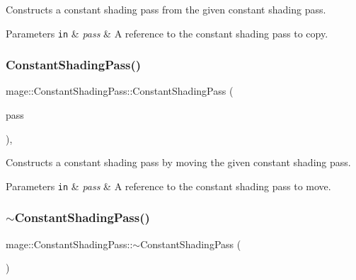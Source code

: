 Constructs a constant shading pass from the given constant shading pass.


\begin{DoxyParams}[1]{Parameters}
\mbox{\tt in}  & {\em pass} & A reference to the constant shading pass to copy. \\
\hline
\end{DoxyParams}
\hypertarget{classmage_1_1_constant_shading_pass_ac613e44e8f19485a0ee0b71b4f30be91}{}\label{classmage_1_1_constant_shading_pass_ac613e44e8f19485a0ee0b71b4f30be91} 
\subsubsection{\texorpdfstring{Constant\+Shading\+Pass()}{ConstantShadingPass()}\hspace{0.1cm}{\footnotesize\ttfamily [3/3]}}
{\footnotesize\ttfamily mage\+::\+Constant\+Shading\+Pass\+::\+Constant\+Shading\+Pass (\begin{DoxyParamCaption}\item[{\hyperlink{classmage_1_1_constant_shading_pass}{Constant\+Shading\+Pass} \&\&}]{pass }\end{DoxyParamCaption})\hspace{0.3cm}{\ttfamily [default]}, {\ttfamily [noexcept]}}

Constructs a constant shading pass by moving the given constant shading pass.


\begin{DoxyParams}[1]{Parameters}
\mbox{\tt in}  & {\em pass} & A reference to the constant shading pass to move. \\
\hline
\end{DoxyParams}
\hypertarget{classmage_1_1_constant_shading_pass_a2ef56dc45910519d5e0137b14768738e}{}\label{classmage_1_1_constant_shading_pass_a2ef56dc45910519d5e0137b14768738e} 
\subsubsection{\texorpdfstring{$\sim$\+Constant\+Shading\+Pass()}{~ConstantShadingPass()}}
{\footnotesize\ttfamily mage\+::\+Constant\+Shading\+Pass\+::$\sim$\+Constant\+Shading\+Pass (\begin{DoxyParamCaption}{ }\end{DoxyParamCaption})\hspace{0.3cm}{\ttfamily [default]}}

